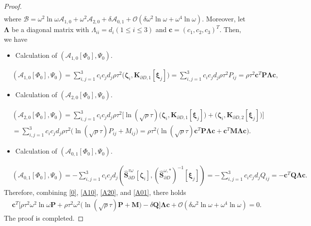 \documentclass[10pt,reqno,oneside]{amsart}%
\theoremstyle{definition}
\theoremstyle{remark}
\numberwithin{equation}{section}
\numberwithin{equation}{section}
\begin{document}
\begin{proof}
\begin{align}
\end{align}
where $\mathcal{B}=\omega^2\ln\omega\mathcal{A}_{1,0}+\omega^2\mathcal{A}_{2,0}+\delta\mathcal{A}_{0,1}
+\mathcal{O}(\delta\omega^2\ln{\omega}+\omega^4\ln{\omega})$. Moreover, let $\mathbf{\Lambda}$ be a diagonal matrix with $\Lambda_{ii}=d_i(1 \leq i \leq 3)$ and $\mathbf{c}=(c_1,c_2,c_3)^T$. Then, we have
\begin{itemize}
\item Calculation of $(\mathcal{A}_{1,0}[\Phi_0],\Psi_0)$.
\end{itemize}
\begin{align}\label{A10}
&(\mathcal{A}_{1,0}[\Phi_0],\Psi_0)=\sum_{i,j=1}^{3}c_{i}c_{j}d_{j}\rho\tau^2\Big(\boldsymbol{\zeta}_i,\mathbf{K}_{\partial D,1}[\boldsymbol{\xi}_j]\Big)
=\sum_{i,j=1}^{3} c_{i}c_{j}d_{j}\rho\tau^2 P_{ij}=\rho\tau^2\mathbf{c}^{T}\mathbf{P}\mathbf{\Lambda}\mathbf{c},%
\end{align}
\begin{itemize}
\item Calculation of $(\mathcal{A}_{2,0}[\Phi_0],\Psi_0)$.
\end{itemize}
\begin{align}\label{A20}
&(\mathcal{A}_{2,0}[\Phi_0],\Psi_0)=\sum_{i,j=1}^{3}c_{i}c_{j}d_{j}\rho\tau^2 \Big[\ln{(\sqrt{\rho}\tau)}\Big(\boldsymbol{\zeta}_i,\mathbf{K}_{\partial D,1}[\boldsymbol{\xi}_j]\Big)+\Big(\boldsymbol{\zeta}_i,\mathbf{K}_{\partial D,2}[\boldsymbol{\xi}_j]\Big)\Big]
\nonumber\\
&=\sum_{i,j=1}^{3}c_{i}c_{j}d_{j}\rho\tau^2  \Big(\ln{(\sqrt{\rho}\tau)}P_{ij}+M_{ij} \Big)=\rho\tau^2\Big(\ln{(\sqrt{\rho}\tau)}\mathbf{c}^{T}\mathbf{P}\mathbf{\Lambda}\mathbf{c}+\mathbf{c}^{T}\mathbf{M}\mathbf{\Lambda}\mathbf{c}\Big).
\end{align}
\begin{itemize}
\item Calculation of $(\mathcal{A}_{0,1}[\Phi_0],\Psi_0)$.
\end{itemize}
\begin{align}\label{A01}
&(\mathcal{A}_{0,1}[\Phi_0],\Psi_0)=-\sum_{i,j=1}^{3}c_{i}c_{j}d_{j}\left(\hat{\mathbf{S}}_{\partial D}^{{\tau\omega} }[\boldsymbol{\zeta}_i],(\hat{\mathbf{S}}_{\partial D}^{{\omega},* })^{-1}[\boldsymbol{\xi}_j]\right)=-\sum_{i,j=1}^{3}c_{i}c_{j}d_{j}Q_{ij}=-\mathbf{c}^{T}\mathbf{Q}\mathbf{\Lambda}\mathbf{c}.
\end{align}
Therefore, combining \eqref{0}, \eqref{A10}, \eqref{A20}, and \eqref{A01}, there holds
\begin{align}
&\mathbf{c}^{T}\Big[  \rho\tau^2\omega^2\ln\omega\mathbf{P}+\rho\tau^2\omega^2\Big(\ln{(\sqrt{\rho}\tau)}\mathbf{P}
+\mathbf{M}\Big)-\delta\mathbf{Q}\Big] \mathbf{\Lambda}\mathbf{c}+\mathcal{O}(\delta\omega^2\ln{\omega}+\omega^4\ln{\omega})=0.\nonumber
\end{align}
The proof is completed.%
\end{proof}
\end{document}

